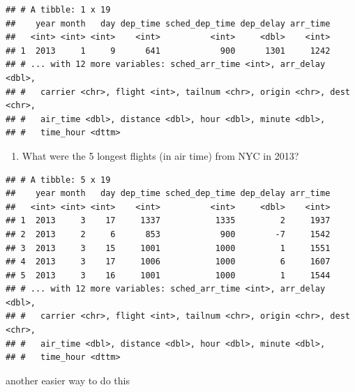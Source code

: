 \documentclass[]{article}
\newenvironment{Shaded}{\begin{snugshade}}{\end{snugshade}}
\newcommand{\KeywordTok}[1]{\textcolor[rgb]{0.13,0.29,0.53}{\textbf{#1}}}
\newcommand{\DataTypeTok}[1]{\textcolor[rgb]{0.13,0.29,0.53}{#1}}
\newcommand{\DecValTok}[1]{\textcolor[rgb]{0.00,0.00,0.81}{#1}}
\newcommand{\StringTok}[1]{\textcolor[rgb]{0.31,0.60,0.02}{#1}}
\newcommand{\OperatorTok}[1]{\textcolor[rgb]{0.81,0.36,0.00}{\textbf{#1}}}
\newcommand{\NormalTok}[1]{#1}
\providecommand{\tightlist}{%
  \setlength{\itemsep}{0pt}\setlength{\parskip}{0pt}}
\begin{document}
\begin{verbatim}
## # A tibble: 1 x 19
##    year month   day dep_time sched_dep_time dep_delay arr_time
##   <int> <int> <int>    <int>          <int>     <dbl>    <int>
## 1  2013     1     9      641            900      1301     1242
## # ... with 12 more variables: sched_arr_time <int>, arr_delay <dbl>,
## #   carrier <chr>, flight <int>, tailnum <chr>, origin <chr>, dest <chr>,
## #   air_time <dbl>, distance <dbl>, hour <dbl>, minute <dbl>,
## #   time_hour <dttm>
\end{verbatim}

\begin{enumerate}
\def\labelenumi{\arabic{enumi}.}
\setcounter{enumi}{2}
\tightlist
\item
  What were the 5 longest flights (in air time) from NYC in 2013?
\end{enumerate}

\begin{Shaded}
\end{Shaded}

\begin{verbatim}
## # A tibble: 5 x 19
##    year month   day dep_time sched_dep_time dep_delay arr_time
##   <int> <int> <int>    <int>          <int>     <dbl>    <int>
## 1  2013     3    17     1337           1335         2     1937
## 2  2013     2     6      853            900        -7     1542
## 3  2013     3    15     1001           1000         1     1551
## 4  2013     3    17     1006           1000         6     1607
## 5  2013     3    16     1001           1000         1     1544
## # ... with 12 more variables: sched_arr_time <int>, arr_delay <dbl>,
## #   carrier <chr>, flight <int>, tailnum <chr>, origin <chr>, dest <chr>,
## #   air_time <dbl>, distance <dbl>, hour <dbl>, minute <dbl>,
## #   time_hour <dttm>
\end{verbatim}

another easier way to do this

\begin{Shaded}
\end{Shaded}
\end{document}

